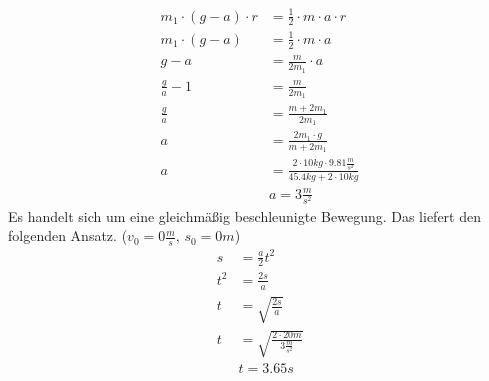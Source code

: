 \begin{align*}
    m_1\cdot(g-a)\cdot r&=\frac{1}{2}\cdot m\cdot a\cdot r\\
    m_1\cdot(g-a)&=\frac{1}{2}\cdot m\cdot a\\
    g-a&=\frac{m}{2m_1}\cdot a\\
    \frac{g}{a}-1&=\frac{m}{2m_1}\\
    \frac{g}{a}&=\frac{m+2m_1}{2m_1}\\
    a&=\frac{2m_1\cdot g}{m+2m_1}\\
    a&=\frac{2\cdot10kg\cdot9.81\frac{m}{s^2}}{45.4kg+2\cdot10kg}\\
    &\boxed{a=3\frac{m}{s^2}}	\tag{a}	\label{eq:212_a}
\end{align*}
Es handelt sich um eine gleichmäßig beschleunigte Bewegung. Das liefert den folgenden Ansatz. ($v_0=0\frac{m}{s}$, $s_0=0m$)
\begin{align*}
    s&=\frac{a}{2}t^2\\
    t^2&=\frac{2s}{a}\\
    t&=\sqrt{\frac{2s}{a}}\\
    t&=\sqrt{\frac{2\cdot20m}{3\frac{m}{s^2}}}\\
    &\boxed{t=3.65s}	\tag{b}	\label{eq:212_b}
\end{align*}